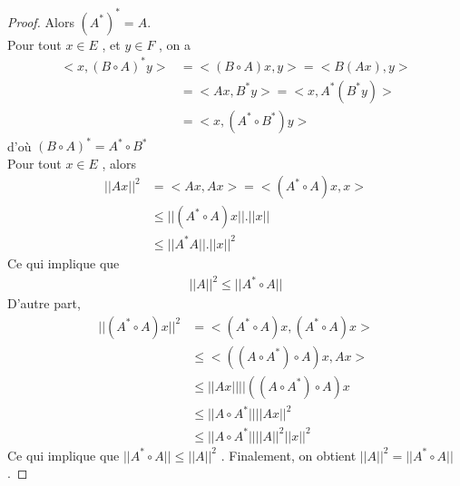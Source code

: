 \documentclass{report}
\begin{document}
{\begin{proof}
Alors $(A^*)^* = A$. \\
 Pour tout $x \in E$ , et $y \in F$ , on a 
	\begin{align*}				 < x,(B\circ A)^*y > &= < (B\circ A)x,y > = < B(Ax),y >   \\
					 				 &= < Ax,B^*y > = < x,A^*(B^*y) >\\
					 					 &= < x,(A^*\circ B^*)y > 
	\end{align*}
d'où $(B \circ A)^* = A^* \circ B^*$ \\
 Pour tout $x \in E$ , alors   
	\begin{align*}				 ||A x||^2 &= < Ax,Ax > = < (A^*\circ A)x,x > \\
					 			&\le ||(A^*\circ A)x||.||x|| \\
					 			&\le ||A^*A||.||x||^2 
	\end{align*}
Ce qui implique que 
	\begin{align*}
					 ||A||^2 \le ||A^*\circ A|| 
	\end{align*}
D'autre part,
	\begin{align*}				 ||(A^*\circ A)x||^2 &= < (A^*\circ A)x,(A^*\circ A)x > \\
					 					  &\le < ((A\circ A^*)\circ A)x,Ax > \\
					 					  &\le ||Ax|| ||((A\circ A^*)\circ A)x \\
					 					  &\le ||A\circ A^*|| ||Ax||^2 \\
					 					  &\le ||A\circ A^*|| ||A||^2 ||x||^2 
	\end{align*}
Ce qui implique que  $||A^*\circ A|| \le ||A||^2$ . Finalement, on obtient $||A||^2 = ||A^* \circ A||$ .
\end{proof}


}
\end{document}

